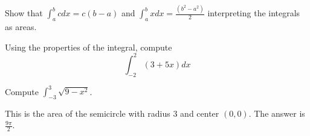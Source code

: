 \documentclass[../calc1-main.tex]{subfiles}
\begin{document}
\begin{example}
  Show that $\int_{a}^b c dx =c(b-a)$ and $\int_a^b x dx = \frac{(b^2 - a^2)}{2}$ interpreting the integrals as areas.
\end{example}

\begin{example}
  Using the properties of the integral, compute
  \[
    \int_{-2}^2 (3+5x) dx
  \]
\end{example}

\begin{example}
  Compute $\int_{-3}^3 \sqrt{9 - x^2}$.
\end{example}
\begin{solution}
  This is the area of the semicircle with radius $3$ and center $(0,0)$. The answer is $\frac{9 \pi}{2}$.
\end{solution}
\end{document}
